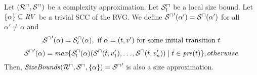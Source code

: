 \begin{theorem}
  Let $({\mathcal{R}^\sqcap}, {\mathcal{S}^\sqcap})$ be a complexity approximation.
  Let ${\mathcal{S}^\sqcap_l}$ be a local size bound.
  Let $\lbrace \alpha \rbrace \subseteq \mathit{RV}$ be a trivial SCC of the RVG.
  We define ${\mathcal{S}^\sqcap}'(\alpha') = {\mathcal{S}^\sqcap}(\alpha')$ for all $\alpha' \neq \alpha$ and
  \[ {\mathcal{S}^\sqcap}'(\alpha) = {\mathcal{S}^\sqcap_l}(\alpha), \text{ if } \alpha = (t, v') \text{ for some initial transition } t \]
  \[ {\mathcal{S}^\sqcap}'(\alpha) = \mathit{max} \lbrace  {\mathcal{S}^\sqcap_l}(\alpha)( {\mathcal{S}^\sqcap}(\tilde{t}, v'_1), \dots, {\mathcal{S}^\sqcap}(\tilde{t}, v'_n)) \mid \tilde{t} \in \mathit{pre}(t) \rbrace, otherwise \]
  Then, $\mathit{SizeBounds}({\mathcal{R}^\sqcap}, {\mathcal{S}^\sqcap}, \lbrace \alpha \rbrace) = {\mathcal{S}^\sqcap}'$ is also a size approximation.
\end{theorem}
